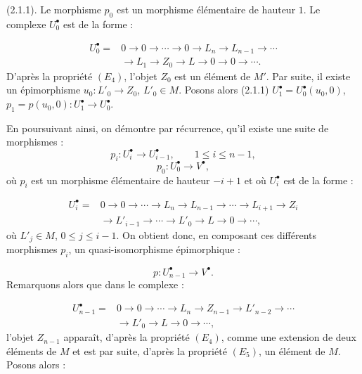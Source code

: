\clearpage
{}%
\begingroup\small\setlength{\parskip}{0pt}\setlength{\emergencystretch}{1.5em}
\setlength{\abovedisplayskip}{4pt plus 2pt minus 2pt}%
\setlength{\belowdisplayskip}{4pt plus 2pt minus 2pt}%

(2.1.1). Le morphisme $p_0$ est un morphisme élémentaire de hauteur $1$.
Le complexe $U_0^\bullet$ est de la forme :

\[
\begin{aligned}
U_0^\bullet={}&0\longrightarrow0\longrightarrow\cdots\longrightarrow0
\longrightarrow L_n\longrightarrow L_{n-1}\longrightarrow\cdots\\
&\longrightarrow L_1\longrightarrow Z_0\longrightarrow L
\longrightarrow0\longrightarrow0\longrightarrow\cdots.
\end{aligned}
\]
D'après la propriété $(E_4)$, l'objet $Z_0$ est un élément de $M'$. Par
suite, il existe un épimorphisme $u_0\colon L'_0\longrightarrow Z_0$,
$L'_0\in M$. Posons alors (2.1.1)
$U_1^\bullet=U_0^\bullet(u_0,0)$,
$p_1=p(u_0,0)\colon U_1^\bullet\longrightarrow U_0^\bullet$.

En poursuivant ainsi, on démontre par récurrence, qu'il existe une suite de
morphismes :
\[
p_i\colon U_i^\bullet\longrightarrow U_{i-1}^\bullet,
\qquad 1\leq i\leq n-1,
\]
\[
p_0\colon U_0^\bullet\longrightarrow V^\bullet,
\]
où $p_i$ est un morphisme élémentaire de hauteur $-i+1$ et où
$U_i^\bullet$ est de la forme :

\[
\begin{aligned}
U_i^\bullet={}&0\longrightarrow0\longrightarrow\cdots
\longrightarrow L_n\longrightarrow L_{n-1}\longrightarrow\cdots
\longrightarrow L_{i+1}\longrightarrow Z_i\\
&\longrightarrow L'_{i-1}\longrightarrow\cdots\longrightarrow L'_0
\longrightarrow L\longrightarrow0\longrightarrow\cdots ,
\end{aligned}
\]
où $L'_j\in M$, $0\leq j\leq i-1$. On obtient donc, en composant ces
différents morphismes $p_i$, un quasi-isomorphisme épimorphique :

\[
p\colon U_{n-1}^\bullet\longrightarrow V^\bullet.
\]
Remarquons alors que dans le complexe :

\[
\begin{aligned}
U_{n-1}^\bullet={}&0\longrightarrow0\longrightarrow\cdots
\longrightarrow L_n\longrightarrow Z_{n-1}\longrightarrow L'_{n-2}
\longrightarrow\cdots\\
&\longrightarrow L'_0\longrightarrow L\longrightarrow0
\longrightarrow\cdots ,
\end{aligned}
\]
l'objet $Z_{n-1}$ apparaît, d'après la propriété $(E_4)$, comme une
extension de deux éléments de $M$ et est par suite, d'après la propriété
$(E_5)$, un élément de $M$. Posons alors :

